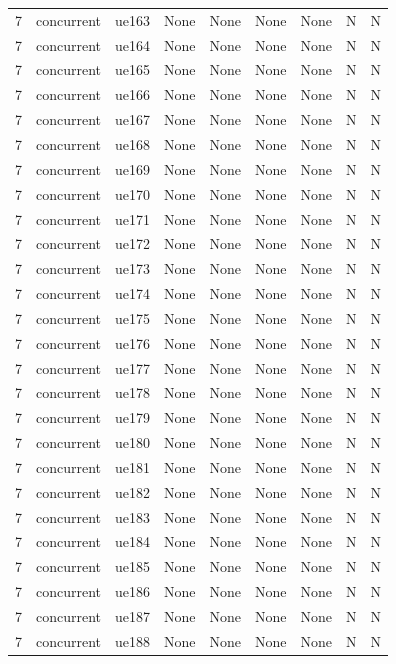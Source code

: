 \begin{table}[ht]
\begin{tabular}{|c|c|c|c|c|c|c|c|c|}
7 & concurrent & ue163 & None & None & None & None & N & N \\
7 & concurrent & ue164 & None & None & None & None & N & N \\
7 & concurrent & ue165 & None & None & None & None & N & N \\
7 & concurrent & ue166 & None & None & None & None & N & N \\
7 & concurrent & ue167 & None & None & None & None & N & N \\
7 & concurrent & ue168 & None & None & None & None & N & N \\
7 & concurrent & ue169 & None & None & None & None & N & N \\
7 & concurrent & ue170 & None & None & None & None & N & N \\
7 & concurrent & ue171 & None & None & None & None & N & N \\
7 & concurrent & ue172 & None & None & None & None & N & N \\
7 & concurrent & ue173 & None & None & None & None & N & N \\
7 & concurrent & ue174 & None & None & None & None & N & N \\
7 & concurrent & ue175 & None & None & None & None & N & N \\
7 & concurrent & ue176 & None & None & None & None & N & N \\
7 & concurrent & ue177 & None & None & None & None & N & N \\
7 & concurrent & ue178 & None & None & None & None & N & N \\
7 & concurrent & ue179 & None & None & None & None & N & N \\
7 & concurrent & ue180 & None & None & None & None & N & N \\
7 & concurrent & ue181 & None & None & None & None & N & N \\
7 & concurrent & ue182 & None & None & None & None & N & N \\
7 & concurrent & ue183 & None & None & None & None & N & N \\
7 & concurrent & ue184 & None & None & None & None & N & N \\
7 & concurrent & ue185 & None & None & None & None & N & N \\
7 & concurrent & ue186 & None & None & None & None & N & N \\
7 & concurrent & ue187 & None & None & None & None & N & N \\
7 & concurrent & ue188 & None & None & None & None & N & N \\

\end{tabular}
\end{table}
